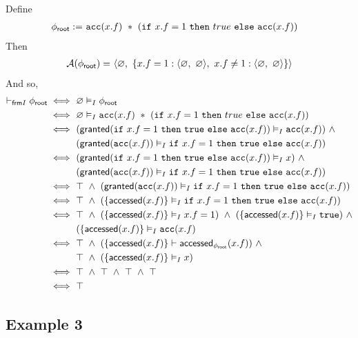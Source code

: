 Define
\begin{align*}
\phiroot := & \
\cacc(x.f) \ \ast \ (\cif \ x.f = 1 \ \cthen \ true \ \celse \ \cacc(x.f))
\end{align*}
Then
\begin{align*}
\mathcal{A}({\phi_\textsf{root}}) = & \
\langle \varnothing ,\ \left\{  x.f = 1 : \langle \varnothing ,\ \varnothing \rangle ,\ x.f \neq 1: \langle \varnothing ,\ \varnothing \rangle  \right\} \rangle \\
\end{align*}
And so,
\begin{align*}
\selfframing \phiroot
\iff & \
\empty \frames \phiroot
\\ \iff & \
\empty \frames \cacc(x.f) \ \ast \ (\cif \ x.f = 1 \ \cthen \ true \ \celse \ \cacc(x.f))
\\ \iff & \
( \granted(\cif \ x.f = 1 \ \cthen \ \ctrue \ \celse \ \cacc(x.f)) \frames \cacc(x.f) ) \ \land \\ & \
( \granted(\cacc(x.f)) \frames \cif \ x.f = 1 \ \cthen \ \ctrue \ \celse \ \cacc(x.f) )
\\ \iff & \
( \granted(\cif \ x.f = 1 \ \cthen \ \ctrue \ \celse \ \cacc(x.f)) \frames x ) \ \land \\ & \
( \granted(\cacc(x.f)) \frames \cif \ x.f = 1 \ \cthen \ \ctrue \ \celse \ \cacc(x.f) )
\\ \iff & \
\top \ \land \ ( \granted(\cacc(x.f)) \frames \cif \ x.f = 1 \ \cthen \ \ctrue \ \celse \ \cacc(x.f) )
\\ \iff & \
\top \ \land \ ( \set{ \accessed(x.f) } \frames \cif \ x.f = 1 \ \cthen \ \ctrue \ \celse \ \cacc(x.f) )
\\ \iff & \
\top \ \land \
( \set{ \accessed(x.f) } \frames x.f = 1 ) \ \land \
( \set{ \accessed(x.f) } \frames \ctrue ) \ \land \\ & \
( \set{ \accessed(x.f) } \frames \cacc(x.f)
\\ \iff & \
\top \ \land \
( \set{ \accessed(x.f) } \entails \accessed_{\phiroot}(x.f) ) \ \land \\ & \
\top \ \land \
( \set{ \accessed(x.f) } \frames x )
\\ \iff & \
\top \ \land \
\top \ \land \
\top \ \land \
\top
\\ \iff & \
\top
\end{align*}

\newpage
\subsection*{Example 3}

